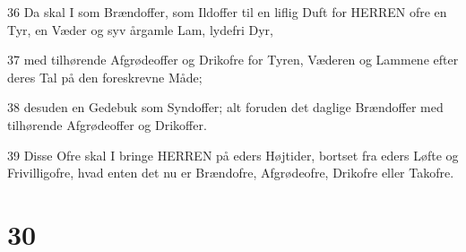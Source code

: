 \par 36 Da skal I som Brændoffer, som Ildoffer til en liflig Duft for HERREN ofre en Tyr, en Væder og syv årgamle Lam, lydefri Dyr,
\par 37 med tilhørende Afgrødeoffer og Drikofre for Tyren, Væderen og Lammene efter deres Tal på den foreskrevne Måde;
\par 38 desuden en Gedebuk som Syndoffer; alt foruden det daglige Brændoffer med tilhørende Afgrødeoffer og Drikoffer.
\par 39 Disse Ofre skal I bringe HERREN på eders Højtider, bortset fra eders Løfte og Frivilligofre, hvad enten det nu er Brændofre, Afgrødeofre, Drikofre eller Takofre.

\chapter{30}

